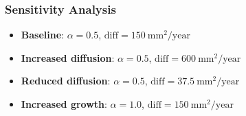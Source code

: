 \documentclass[12pt, letterpaper]{article}
\begin{document}
\subsubsection*{Sensitivity Analysis}

\begin{itemize}
    \item \textbf{Baseline}: $\alpha = 0.5$, $\mathrm{diff} = 150 \ \mathrm{mm}^2/\mathrm{year}$
    \item \textbf{Increased diffusion}: $\alpha = 0.5$, $\mathrm{diff} = 600 \ \mathrm{mm}^2/\mathrm{year}$
    \item \textbf{Reduced diffusion}: $\alpha = 0.5$, $\mathrm{diff} = 37.5 \ \mathrm{mm}^2/\mathrm{year}$
    \item \textbf{Increased growth}: $\alpha = 1.0$, $\mathrm{diff} = 150 \ \mathrm{mm}^2/\mathrm{year}$
\end{itemize}
\end{document}
